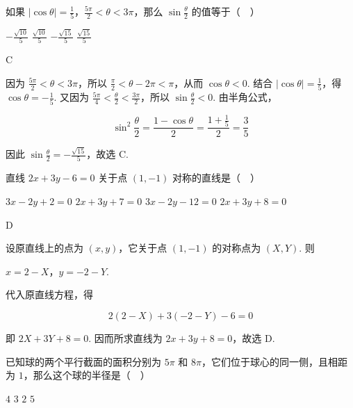 \begin{problem}
如果 \(\left|\cos \theta\right| = \frac{1}{5}\)，\(\frac{5\pi}{2} < \theta < 3\pi\)，那么 \(\sin \frac{\theta}{2}\) 的值等于（\(\quad\)）

\choices
    {\(-\frac{\sqrt{10}}{5}\)}
    {\(\frac{\sqrt{10}}{5}\)}
    {\(-\frac{\sqrt{15}}{5}\)}
    {\(\frac{\sqrt{15}}{5}\)}
\end{problem}

\begin{answer}
C
\end{answer}

\begin{solution}
因为 \(\frac{5\pi}{2}<\theta<3\pi\)，所以 \(\frac\pi2<\theta-2\pi<\pi\)，从而 \(\cos\theta<0\). 结合 \(\left|\cos\theta\right|=\frac15\)，得 \(\cos\theta=-\frac15\). 又因为 \(\frac{5\pi}{4}<\frac\theta2<\frac{3\pi}{2}\)，所以 \(\sin\frac\theta2<0\). 由半角公式，

\[\sin^2\frac\theta2=\frac{1-\cos\theta}{2}=\frac{1+\frac15}{2}=\frac35\]

因此 \(\sin\frac\theta2=-\frac{\sqrt{15}}5\)，故选 C.
\end{solution}

\begin{problem}
直线 \(2x + 3y - 6 = 0\) 关于点 \((1,-1)\) 对称的直线是（\(\quad\)）

\choices
    {\(3x - 2y + 2 = 0\)}
    {\(2x + 3y + 7 = 0\)}
    {\(3x - 2y - 12 = 0\)}
    {\(2x + 3y + 8 = 0\)}
\end{problem}

\begin{answer}
D
\end{answer}

\begin{solution}
设原直线上的点为 \((x,y)\)，它关于点 \((1,-1)\) 的对称点为 \((X,Y)\). 则

\(x=2-X\)，\(y=-2-Y\).

代入原直线方程，得

\[2(2-X)+3(-2-Y)-6=0\]

即 \(2X+3Y+8=0\). 因而所求直线为 \(2x+3y+8=0\)，故选 D.
\end{solution}

\begin{problem}
已知球的两个平行截面的面积分别为 \(5\pi\) 和 \(8\pi\)，它们位于球心的同一侧，且相距为 \(1\)，那么这个球的半径是（\(\quad\)）

\choices
    {\(4\)}
    {\(3\)}
    {\(2\)}
    {\(5\)}
\end{problem}

